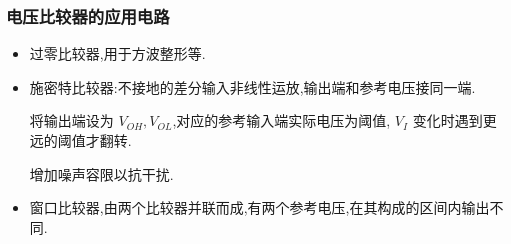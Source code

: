         \subsubsection{电压比较器的应用电路}
        \begin{itemize}
            \item 过零比较器,用于方波整形等.
            \item 施密特比较器:不接地的差分输入非线性运放,输出端和参考电压接同一端.

                将输出端设为 $V_{OH},V_{OL}$,对应的参考输入端实际电压为阈值, $V_{I}$ 变化时遇到更远的阈值才翻转.

                增加噪声容限以抗干扰.
            \item 窗口比较器,由两个比较器并联而成,有两个参考电压,在其构成的区间内输出不同.
        \end{itemize}

